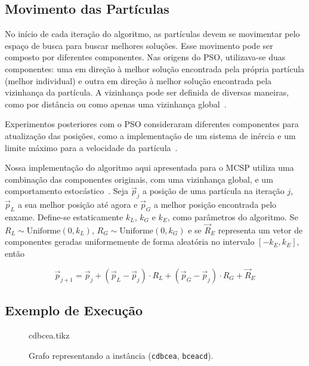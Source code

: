 \subsection{Movimento das Partículas} \label{sec:movimento}

    No início de cada iteração do algoritmo, as partículas devem se movimentar pelo espaço de busca para buscar melhores soluções. Esse movimento pode ser composto por diferentes componentes. Nas origens do PSO, utilizava-se duas componentes: uma em direção à melhor solução encontrada pela própria partícula (melhor individual) e outra em direção à melhor solução encontrada pela vizinhança da partícula. A vizinhança pode ser definida de diversas maneiras, como por distância ou como apenas uma vizinhança global~\cite{bratton_defining_2007}.

    Experimentos posteriores com o PSO consideraram diferentes componentes para atualização das posições, como a implementação de um sistema de inércia e um limite máximo para a velocidade da partícula~\cite{shi_parameter_1998}.

    Nossa implementação do algoritmo aqui apresentada para o MCSP utiliza uma combinação das componentes originais, com uma vizinhança global, e um comportamento estocástico~\cite[p.~642]{marti_handbook_2018}. Seja $\vec{p}_j$ a posição de uma partícula na iteração $j$, $\vec{p}_L$ a sua melhor posição até agora e $\vec{p}_G$ a melhor posição encontrada pelo enxame. Define-se estaticamente $k_L$, $k_G$ e $k_E$, como parâmetros do algoritmo. Se $R_L \sim \text{Uniforme}(0, k_L)$, $R_G \sim \text{Uniforme}(0, k_G)$ e se $\vec{R}_E$ representa um vetor de componentes geradas uniformemente de forma aleatória no intervalo $[-k_E, k_E]$, então

    \[
        \vec{p}_{j+1} = \vec{p}_j + \left(\vec{p}_L - \vec{p}_j\right) \cdot R_L + \left(\vec{p}_G - \vec{p}_j\right) \cdot R_G + \vec{R}_E
    \]

\subsection{Exemplo de Execução}

    \begin{figure}[htb]
        \centering
        {cdbcea.tikz}

        \caption{Grafo representando a instância (\texttt{cdbcea}, \texttt{bceacd}).}
        \label{fig:grafo-pso}
    \end{figure}

